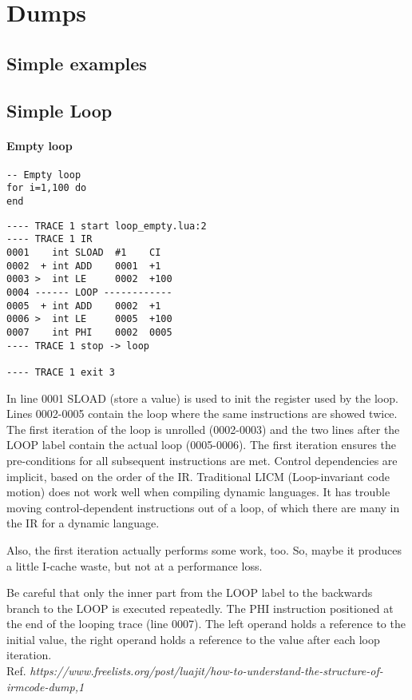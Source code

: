 \chapter{Dumps}

\section{Simple examples}

\section{Simple Loop}

\subsubsection{Empty loop}

\begin{lstlisting}[style=LuaStyle]
-- Empty loop
for i=1,100 do
end
\end{lstlisting}

\begin{lstlisting}[style=DumpStyle]
---- TRACE 1 start loop_empty.lua:2
---- TRACE 1 IR
0001    int SLOAD  #1    CI
0002  + int ADD    0001  +1  
0003 >  int LE     0002  +100
0004 ------ LOOP ------------
0005  + int ADD    0002  +1  
0006 >  int LE     0005  +100
0007    int PHI    0002  0005
---- TRACE 1 stop -> loop

---- TRACE 1 exit 3
\end{lstlisting}

In line 0001 SLOAD (store a value) is used to init the register used by the loop. Lines 0002-0005 contain the loop where the same instructions are showed twice. The first iteration of the loop is unrolled (0002-0003) and the two lines after the LOOP label contain the actual loop (0005-0006). The first iteration ensures the pre-conditions for all subsequent instructions are met. Control dependencies are implicit, based on
the order of the IR. Traditional LICM (Loop-invariant code motion) does not work well when compiling dynamic languages. It has trouble moving control-dependent instructions
out of a loop, of which there are many in the IR for a dynamic language.

Also, the first iteration actually performs some work, too. So, maybe it produces a little I-cache waste, but not at a performance loss.

Be careful that only the inner part from the LOOP label to the backwards
branch to the LOOP is executed repeatedly.
The PHI instruction positioned at the end of the looping trace (line 0007). The left operand holds a reference to the initial value, the right operand holds a reference to the value after each loop iteration.\\

Ref. \textit{https://www.freelists.org/post/luajit/how-to-understand-the-structure-of-irmcode-dump,1}

